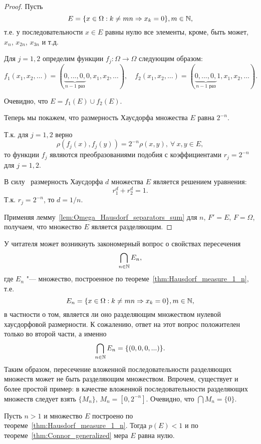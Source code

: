 \begin{proof}
	Пусть
	\begin{equation}
		E= \{ x \in \Omega : k \neq mn \Rightarrow x_k = 0\}, m\in \mathbb{N}
		,
	\end{equation}
	т.е. у последовательности $x \in E$ равны нулю все элементы, кроме, быть может, $x_n$, $x_{2n}$, $x_{3n}$ и т.д.

	Для $j=1,2$ определим функции $f_j : \Omega \to \Omega$ следующим образом:
	\begin{equation}
		f_1(x_1, x_2, \dots)=(\underbrace{0, ..., 0,}_{\mbox{$n-1$ раз}} 0, x_1, x_2, \dots)
		,
		\quad
		f_2(x_1, x_2, \dots)=(\underbrace{0, ..., 0,}_{\mbox{$n-1$ раз}} 1, x_1, x_2, \dots)
		.
	\end{equation}

	Очевидно, что $E=f_1(E)\cup f_2(E).$

	Теперь мы покажем, что размерность Хаусдорфа множества $E$ равна $2^{-n}$.

	Т.к. для $j=1,2$ верно
	 $$\rho(f_j(x),f_j(y))=2^{-n}\rho(x,y), \ \forall \ x, y \in E,$$
	 то функции $f_j$ являются преобразованиями подобия с коэффициентами $r_j=2^{-n}$ для $j=1,2$.


	В силу~\cite[Теорема 9.3]{falconer2003fractal} размерность Хаусдорфа $d$ множества $E$ является решением уравнения:
	$$ r_1^d+r_2^d=1.$$
	Т.к. $r_j=2^{-n}$, то
	$d=1/n.$

	Применяя лемму~\ref{lem:Omega_Hausdorf_separators_sum}
	для $n$, $F'=E$, $F=\Omega$, получаем, что множество $E$ является разделяющим.
\end{proof}

\begin{remark}
	У читателя может возникнуть закономерный вопрос о свойствах пересечения
	\begin{equation}
		\bigcap_{n\in \mathbb{N}} E_{n}
		,
	\end{equation}
	где $E_n$ "--- множество, построенное по теореме~\ref{thm:Hausdorf_measure_1_n}, т.е.
	\begin{equation}
		E_n = \{ x \in \Omega : k \neq mn \Rightarrow x_k = 0\}, m\in \mathbb{N}
		,
	\end{equation}
	в частности о том, является ли оно разделяющим множеством нулевой хаусдорфовой размерности.
	К сожалению, ответ на этот вопрос положителен только во второй части, а именно
	\begin{equation}
		\bigcap_{n\in \mathbb{N}} E_n = \{(0,0,0,...)\}
		.
	\end{equation}
	Таким образом, пересечение вложенной последовательности разделяющих множеств может не быть разделяющим множеством.
	Впрочем, существует и более простой пример:
	в качестве вложенной последовательности разделяющих множеств следует взять $\{M_n\}$, $M_n = [0, 2^{-n}]$.
	Очевидно, что $\bigcap\limits M_n = \{0\}$.
\end{remark}


\begin{remark}
	Пусть $n>1$ и множество $E$ построено по теореме~\ref{thm:Hausdorf_measure_1_n}.
	Тогда $p(E)< 1$ и по теореме~\ref{thm:Connor_generalized} мера $E$ равна нулю.
\end{remark}
